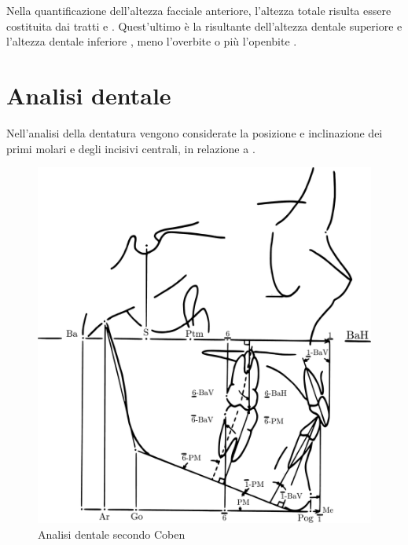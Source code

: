 Nella quantificazione dell'altezza facciale anteriore, l'altezza totale  risulta essere costituita dai tratti  e . Quest'ultimo è la risultante dell'altezza dentale superiore  e l'altezza dentale inferiore , meno l'overbite o più l'openbite .

\section{Analisi dentale}
Nell'analisi della dentatura vengono considerate la posizione e inclinazione dei primi molari e degli incisivi centrali, in relazione a .

\begin{figure}
\centering
\includegraphics[width=.6\columnwidth]{./images/coben_dentale.pdf}
\caption{Analisi dentale secondo Coben}
\label{fig:coben_dentale}
\end{figure}

